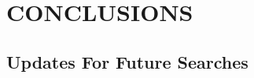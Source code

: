 %
%
%



\chapter{\texorpdfstring{\uppercase {Conclusions}}{Conclusions}}
\label{ch:conclusion}

\section{Updates For Future Searches}